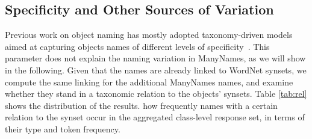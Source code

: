 \subsection{Specificity and Other Sources of Variation}
Previous work on object naming has mostly adopted taxonomy-driven models aimed at capturing objects names of different levels of specificity~\cite{+++}.
This parameter does not explain the naming variation in ManyNames, as we will show in the following. 
Given that the \vg names are already linked to WordNet synsets, we compute the same linking for the additional ManyNames names, and examine whether they stand in a taxonomic relation to the objects'  \vg  synsets.%
%
Table \ref{tab:rel} shows the distribution of the results. 
how frequently names with a certain relation to the synset occur in the aggregated class-level response set, in terms of their  type and token frequency. 
